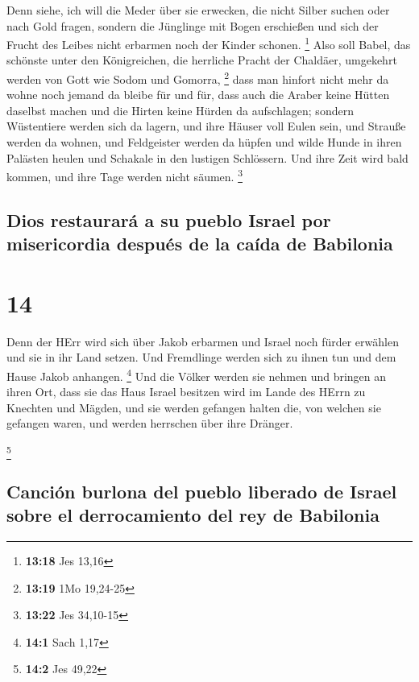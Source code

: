 Denn siehe, ich will die Meder über sie erwecken, die
nicht Silber suchen oder nach Gold fragen,  sondern die
Jünglinge mit Bogen erschießen und sich der Frucht des Leibes nicht
erbarmen noch der Kinder schonen. \footnote{\textbf{13:18} Jes 13,16}
 Also soll Babel, das schönste unter den Königreichen,
die herrliche Pracht der Chaldäer, umgekehrt werden von Gott wie Sodom
und Gomorra, \footnote{\textbf{13:19} 1Mo 19,24-25}  dass
man hinfort nicht mehr da wohne noch jemand da bleibe für und für, dass
auch die Araber keine Hütten daselbst machen und die Hirten keine Hürden
da aufschlagen;  sondern Wüstentiere werden sich da
lagern, und ihre Häuser voll Eulen sein, und Strauße werden da wohnen,
und Feldgeister werden da hüpfen  und wilde Hunde in
ihren Palästen heulen und Schakale in den lustigen Schlössern. Und ihre
Zeit wird bald kommen, und ihre Tage werden nicht säumen. \footnote{\textbf{13:22}
  Jes 34,10-15}

\hypertarget{dios-restauraruxe1-a-su-pueblo-israel-por-misericordia-despuuxe9s-de-la-cauxedda-de-babilonia}{%
\subsection{Dios restaurará a su pueblo Israel por misericordia después
de la caída de
Babilonia}\label{dios-restauraruxe1-a-su-pueblo-israel-por-misericordia-despuuxe9s-de-la-cauxedda-de-babilonia}}

\hypertarget{section-13}{%
\section{14}\label{section-13}}

 Denn der HErr wird sich über Jakob erbarmen und Israel
noch fürder erwählen und sie in ihr Land setzen. Und Fremdlinge werden
sich zu ihnen tun und dem Hause Jakob anhangen. \footnote{\textbf{14:1}
  Sach 1,17}  Und die Völker werden sie nehmen und bringen
an ihren Ort, dass sie das Haus Israel besitzen wird im Lande des HErrn
zu Knechten und Mägden, und sie werden gefangen halten die, von welchen
sie gefangen waren, und werden herrschen über ihre Dränger.

\footnote{\textbf{14:2} Jes 49,22}

\hypertarget{canciuxf3n-burlona-del-pueblo-liberado-de-israel-sobre-el-derrocamiento-del-rey-de-babilonia}{%
\subsection{Canción burlona del pueblo liberado de Israel sobre el
derrocamiento del rey de
Babilonia}\label{canciuxf3n-burlona-del-pueblo-liberado-de-israel-sobre-el-derrocamiento-del-rey-de-babilonia}}

